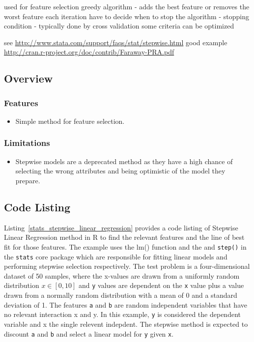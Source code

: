 used for feature selection
greedy algorithm - adds the best feature or removes the worst feature each iteration
have to decide when to stop the algorithm - stopping condition - typically done by cross validation
some criteria can be optimized

see \url{http://www.stata.com/support/faqs/stat/stepwise.html}
good example \url{http://cran.r-project.org/doc/contrib/Faraway-PRA.pdf}

\subsection{Overview}

\subsubsection{Features}

\begin{itemize}
	\item Simple method for feature selection.
\end{itemize}

\subsubsection{Limitations}

\begin{itemize}
	\item Stepwise models are a deprecated method as they have a high chance of selecting the wrong attributes and being optimistic of the model they prepare.
\end{itemize}



\subsection{Code Listing}
Listing~\ref{stats_stepwise_linear_regression} provides a code listing of Stepwise Linear Regression method in R to find the relevant features and the line of best fit for those features.
The example uses the {lm()} function and the and \texttt{step()} in the \texttt{stats} core package which are responsible for fitting linear models and performing stepwise selection respectively.
The test problem is a four-dimensional dataset of 50 samples, where the x-values are drawn from a uniformly random distribution $x \in [0,10]$ and \texttt{y} values are dependent on the \texttt{x} value plus a value drawn from a normally random distribution with a mean of 0 and a standard deviation of 1. The features \texttt{a} and \texttt{b} are random independent variables that have no relevant interaction x and y. In this example, \texttt{y} is considered the dependent variable and x the single relevent indepdent. The stepwise method is expected to discount \texttt{a} and \texttt{b} and select a linear model for \texttt{y} given \texttt{x}.

